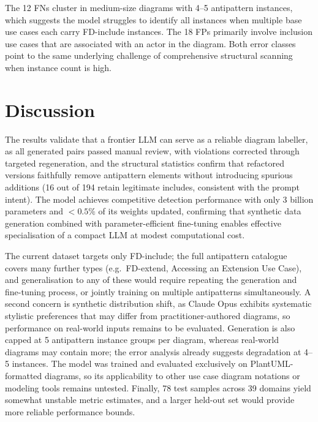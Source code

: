 \documentclass[12pt, a4paper]{article}
\begin{document}
The 12 FNs cluster in medium-size diagrams with 4--5 antipattern instances,
which suggests the model struggles to identify all instances when multiple
base use cases each carry FD-include instances.  The 18 FPs primarily involve
inclusion use cases that are associated with an actor in the diagram.  Both error classes point to the same underlying challenge of comprehensive
structural scanning when instance count is high.

\section{Discussion}
\label{sec:discussion}


The results validate that a frontier LLM can serve as a reliable diagram
labeller, as all generated pairs passed manual review, with violations
corrected through targeted regeneration, and the structural statistics
confirm that refactored versions faithfully remove antipattern elements
without introducing spurious additions (16 out of 194 retain legitimate
includes, consistent with the prompt intent).  The model achieves competitive
detection performance with only 3 billion parameters and $<0.5\%$ of its
weights updated, confirming that synthetic data generation combined with
parameter-efficient fine-tuning enables effective specialisation of a compact
LLM at modest computational cost.


The current dataset targets only FD-include; the full antipattern
catalogue~\cite{elattar2006matching,elattar2010improving} covers many
further types (e.g.\ FD-extend, Accessing an Extension Use Case), and
generalisation to any of these would require repeating the generation and
fine-tuning process, or jointly training on multiple antipatterns
simultaneously.  A second concern is synthetic distribution shift, as Claude Opus exhibits
systematic stylistic preferences that may differ from practitioner-authored
diagrams, so performance on real-world inputs remains to be evaluated.  Generation is also capped at 5 antipattern instance
groups per diagram, whereas real-world diagrams may contain more; the error
analysis already suggests degradation at 4--5 instances.  The model was trained and evaluated exclusively on PlantUML-formatted
diagrams, so its applicability to other use case diagram notations or
modeling tools remains untested.  Finally, 78 test samples across 39 domains
yield somewhat unstable metric estimates, and a larger held-out set would
provide more reliable performance bounds.
\end{document}
